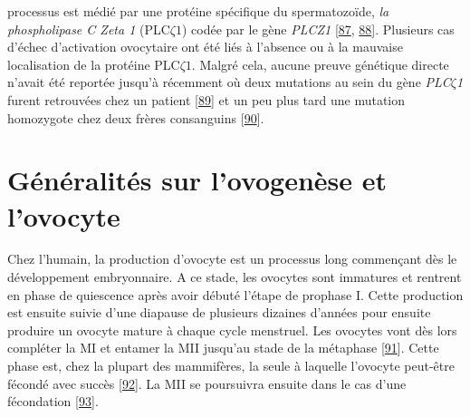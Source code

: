 \documentclass[12pt,a4paper,twoside]{ugathesis}
\theoremstyle{definition}
\theoremstyle{definition}
\theoremstyle{definition}
\theoremstyle{remark}
\begin{document}
\begin{enumerate}
  processus est médié par une protéine spécifique du spermatozoïde,
  \emph{la phospholipase C Zeta 1} (PLC\(\zeta 1\)) codée par le gène
  \emph{PLCZ1} {[}\protect\hyperlink{ref-Nomikos2013}{87},
  \protect\hyperlink{ref-Amdani2013}{88}{]}. Plusieurs cas d'échec
  d'activation ovocytaire ont été liés à l'absence ou à la mauvaise
  localisation de la protéine PLC\(\zeta1\). Malgré cela, aucune preuve
  génétique directe n'avait été reportée jusqu'à récemment où deux
  mutations au sein du gène \emph{PLC}\(\zeta\)\emph{1} furent
  retrouvées chez un patient
  {[}\protect\hyperlink{ref-Heytens2009}{89}{]} et un peu plus tard une
  mutation homozygote chez deux frères consanguins
  {[}\protect\hyperlink{ref-Escoffier2016}{90}{]}.
\end{enumerate}

\newpage  

\section{Généralités sur l'ovogenèse et
l'ovocyte}\label{generalites-sur-lovogenese-et-lovocyte}

Chez l'humain, la production d'ovocyte est un processus long commençant
dès le développement embryonnaire. A ce stade, les ovocytes sont
immatures et rentrent en phase de quiescence après avoir débuté l'étape
de prophase I. Cette production est ensuite suivie d'une diapause de
plusieurs dizaines d'années pour ensuite produire un ovocyte mature à
chaque cycle menstruel. Les ovocytes vont dès lors compléter la MI et
entamer la MII jusqu'au stade de la métaphase
{[}\protect\hyperlink{ref-Eppig1996}{91}{]}. Cette phase est, chez la
plupart des mammifères, la seule à laquelle l'ovocyte peut-être fécondé
avec succès {[}\protect\hyperlink{ref-EPPIG2004}{92}{]}. La MII se
poursuivra ensuite dans le cas d'une fécondation
{[}\protect\hyperlink{ref-Tosti2016}{93}{]}.
\end{document}
